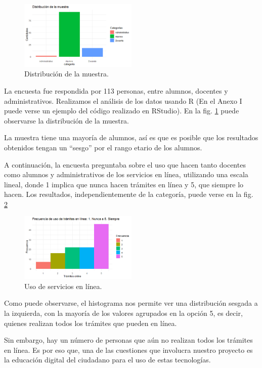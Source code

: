 \documentclass[a4paper]{article}
\begin{document}
\begin{figure}
\centering
\includegraphics[width=0.5\textwidth]{Imagen2.png}
\caption{\label{fig:Imagen2}Distribución de la muestra.}
\end{figure}

La encuesta fue respondida por 113 personas, entre alumnos, docentes y administrativos. Realizamos el análisis de los datos usando R (En el Anexo I puede verse un ejemplo del código realizado en RStudio). En la fig. \ref{fig:Imagen2} puede observarse la distribución de la muestra.

La muestra tiene una mayoría de alumnos, así es que es posible que los resultados obtenidos tengan un “sesgo” por el rango etario de los alumnos.

A continuación, la encuesta preguntaba sobre el uso que hacen tanto docentes como alumnos y administrativos de los servicios en línea, utilizando una escala lineal, donde 1 implica que nunca hacen trámites en línea y 5, que siempre lo hacen. Los resultados, independientemente de la categoría, puede verse en la fig. \ref{fig:Imagen3}

\begin{figure}
\centering
\includegraphics[width=0.5\textwidth]{Imagen3.png}
\caption{\label{fig:Imagen3}Uso de servicios en línea.}
\end{figure}

Como puede observarse, el histograma nos permite ver una distribución sesgada a la izquierda, con la mayoría de los valores agrupados en la opción 5, es decir, quienes realizan todos los trámites que pueden en línea. 

Sin embargo, hay un número de personas que aún no realizan todos los trámites en línea. Es por eso que, una de las cuestiones que involucra nuestro proyecto es la educación digital del ciudadano para el uso de estas tecnologías. 
\end{document}
